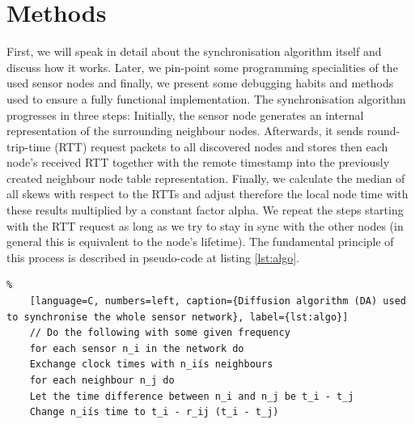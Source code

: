 \documentclass{llncs}
\begin{document}
	\section{Methods}
	
	First, we will speak in detail about the synchronisation algorithm itself and discuss how it works. Later, we pin-point some programming specialities of the used sensor nodes and finally, we present some debugging habits and methods used to ensure a fully functional implementation.
	\bigbreak
	\noindent The synchronisation algorithm progresses in three steps: Initially, the sensor node generates an internal representation of the surrounding neighbour nodes. Afterwards, it sends round-trip-time (RTT) request packets to all discovered nodes and stores then each node's received RTT together with the remote timestamp into the previously created neighbour node table representation. Finally, we calculate the median of all skews with respect to the RTTs and adjust therefore the local node time with these results multiplied by a constant factor alpha. We repeat the steps starting with the RTT request as long as we try to stay in sync with the other nodes (in general this is equivalent to the node's lifetime). The fundamental principle of this process is described in pseudo-code at listing  \ref{lst:algo}.
	
	\begin{lstlisting}%
	[language=C, numbers=left, caption={Diffusion algorithm (DA) used to synchronise the whole sensor network}, label={lst:algo}]
	// Do the following with some given frequency
	for each sensor n_i in the network do
	Exchange clock times with n_iís neighbours
	for each neighbour n_j do
	Let the time difference between n_i and n_j be t_i - t_j
	Change n_iís time to t_i - r_ij (t_i - t_j)
	\end{lstlisting}
	
\end{document}
